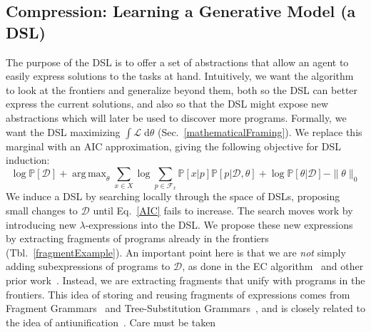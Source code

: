 \documentclass{article}
\newcommand{\system}{\textsc{EC$^2$} }
\newcommand{\lowerBound}{\mathscr{L}}
\DeclareMathOperator*{\argmax}{arg\,max} %
\newcommand{\probability}{\mathds{P}} %
\begin{document}

\subsection{Compression: Learning a Generative Model (a DSL)}\label{grammarInductionSection}

The purpose of the DSL is to
offer a set of abstractions
that allow an agent to easily express solutions to the tasks at hand.
Intuitively, we want the algorithm to
look at  the frontiers and
generalize beyond them, 
both so the DSL can better express the current solutions,
and  also so that the DSL might expose new abstractions
which will later be used to
discover more programs.
 Formally, we want the DSL maximizing $\int \lowerBound\;\mathrm{d}\theta$ (Sec.~\ref{mathematicalFraming}).
We replace this marginal with an AIC approximation, giving the following objective for DSL induction:
\begin{equation}
      \log \probability[\mathcal{D}] + \argmax_{\theta}\sum_{x\in X}\log \sum_{p\in \mathcal{F}_x}\probability[x|p]\probability[p|\mathcal{D},\theta] + \log \probability[\theta|\mathcal{D}] - \|\theta\|_0 \label{AIC}
  \end{equation}
We induce a DSL by searching locally through the space of DSLs,
proposing small changes to $\mathcal{D}$ until Eq.~\ref{AIC} fails to increase.
The search moves work by introducing new
$\lambda$-expressions into the DSL.
We propose these new expressions by extracting fragments of
programs already in the frontiers (Tbl.~\ref{fragmentExample}).
An important point here is that we are \emph{not} simply adding
subexpressions of programs to $\mathcal{D}$, as done in the EC algorithm~\cite{Dechter:2013:BLV:2540128.2540316} and other prior work~\cite{DBLP:conf/ecai/LinDETM14}.  Instead, we are
extracting fragments that unify with programs in the frontiers.  This
idea of storing and reusing fragments of expressions comes from
Fragment Grammars~\cite{tim} and Tree-Substitution
Grammars~\cite{cohn2010inducing}, and is closely related to the idea
of antiunification~\cite{henderson2013cumulative,hwang2011inducing}.
Care must be taken
\end{document}
